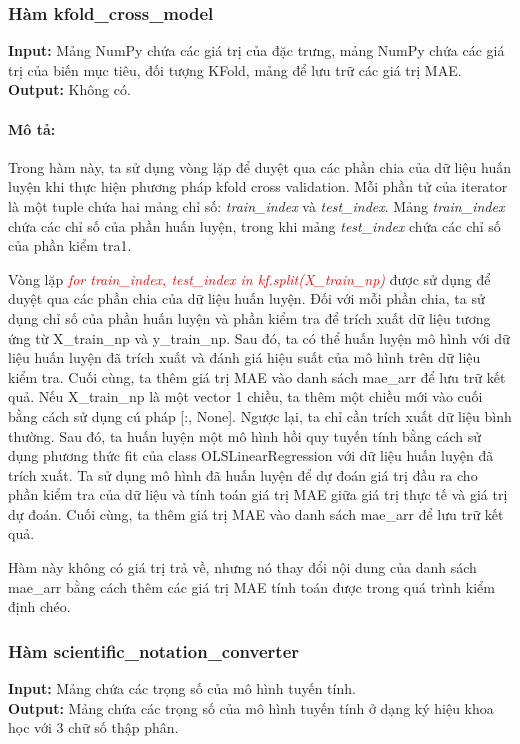 \documentclass[]{article}
\begin{document}
\subsubsection{Hàm kfold\_cross\_model}
\noindent
\textbf{Input:} Mảng NumPy chứa các giá trị của đặc trưng, mảng NumPy chứa các giá trị của biến mục tiêu, đối tượng KFold, mảng để lưu trữ các giá trị MAE. \\
\textbf{Output:} Không có.
\paragraph{Mô tả:}

Trong hàm này, ta sử dụng vòng lặp để duyệt qua các phần chia của dữ liệu huấn luyện khi thực hiện phương pháp kfold cross validation. Mỗi phần tử của iterator là một tuple chứa hai mảng chỉ số: \textit{train\_index} và \textit{test\_index}. Mảng \textit{train\_index} chứa các chỉ số của phần huấn luyện, trong khi mảng \textit{test\_index} chứa các chỉ số của phần kiểm tra1.

Vòng lặp \textcolor{red}{\textit{for train\_index, test\_index in kf.split(X\_train\_np)}} được sử dụng để duyệt qua các phần chia của dữ liệu huấn luyện. Đối với mỗi phần chia, ta sử dụng chỉ số của phần huấn luyện và phần kiểm tra để trích xuất dữ liệu tương ứng từ X\_train\_np và y\_train\_np. Sau đó, ta có thể huấn luyện mô hình với dữ liệu huấn luyện đã trích xuất và đánh giá hiệu suất của mô hình trên dữ liệu kiểm tra. Cuối cùng, ta thêm giá trị MAE vào danh sách mae\_arr để lưu trữ kết quả. Nếu X\_train\_np là một vector 1 chiều, ta thêm một chiều mới vào cuối bằng cách sử dụng cú pháp [:, None]. Ngược lại, ta chỉ cần trích xuất dữ liệu bình thường. Sau đó, ta huấn luyện một mô hình hồi quy tuyến tính bằng cách sử dụng phương thức fit của class OLSLinearRegression với dữ liệu huấn luyện đã trích xuất. Ta sử dụng mô hình đã huấn luyện để dự đoán giá trị đầu ra cho phần kiểm tra của dữ liệu và tính toán giá trị MAE giữa giá trị thực tế và giá trị dự đoán. Cuối cùng, ta thêm giá trị MAE vào danh sách mae\_arr để lưu trữ kết quả.

Hàm này không có giá trị trả về, nhưng nó thay đổi nội dung của danh sách mae\_arr bằng cách thêm các giá trị MAE tính toán được trong quá trình kiểm định chéo.

\subsubsection{Hàm scientific\_notation\_converter}
\noindent
\textbf{Input:} Mảng chứa các trọng số của mô hình tuyến tính. \\
\textbf{Output:} Mảng chứa các trọng số của mô hình tuyến tính ở dạng ký hiệu khoa học với 3 chữ số thập phân.
\end{document}
